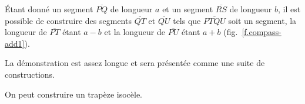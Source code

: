 \begin{theorem}\label{thm.add-subtract-mm}
Étant donné un segment $\overline{PQ}$ de longueur $a$ et un segment $\overline{RS}$ de longueur $b$, il est possible de construire des segments  $\overline{QT}$ et $\overline{QU}$ tels que $\overline{PTQU}$ soit un segment, la longueur de $\overline{PT}$ étant $a-b$ et la longueur de $\overline{PU}$ étant $a+b$  (fig.~\ref{f.compass-add1}).
\end{theorem}



La démonstration est assez longue et sera présentée comme une suite de constructions.


\begin{theorem}\label{thm.compass-trapezoid}
On peut construire un trapèze isocèle.
\end{theorem}


